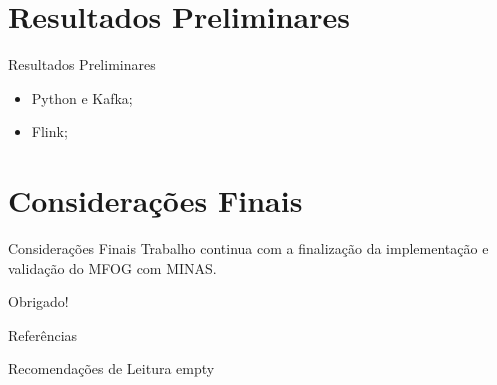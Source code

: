 \documentclass[aspectratio=43,10pt]{beamer}
\begin{document}
\section{Resultados Preliminares}
\begin{frame}[fragile]{Resultados Preliminares}
\begin{itemize}
\item Python e Kafka;
\item Flink;
\end{itemize}
\end{frame}

\section{Considerações Finais}
\begin{frame}{Considerações Finais}
Trabalho continua com a finalização da implementação e validação do MFOG com MINAS.
\end{frame}

{\begin{frame}[standout]
  Obrigado!
\end{frame}}

\begin{frame}[allowframebreaks]{Referências}
  
\end{frame}

\appendix

\begin{frame}[fragile]{Recomendações de Leitura}
empty
\end{frame}
\end{document}

